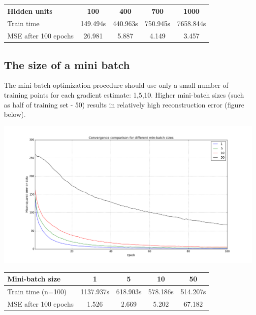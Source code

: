 \documentclass[a4paper]{scrartcl}
\begin{document}
\hspace{1cm}
\begin{tabular}{ | l || c | c | c | c | } 
	\hline
	Hidden units & 100 & 400 & 700 & 1000 \\ \hline
	Train time & 149.494s & 440.963s & 750.945s & 7658.844s \\ \hline
	MSE after 100 epochs & 26.981 & 5.887 & 4.149 & 3.457\\ 
	\hline 
\end{tabular}
\subsection{The size of a mini batch}
The mini-batch optimization procedure should use only a small number of training points for each gradient estimate: 1,5,10. Higher mini-batch sizes (such as half of training set - 50) results in relatively high reconstruction error (figure below). 
\begin{center}
\includegraphics[width=14cm]{images/batch.png}
\end{center}
\hspace{1cm}
\begin{tabular}{|l||c|c|c|c|} \hline
Mini-batch size & 1 & 5 & 10 & 50
\\ \hline
Train time (n=100) & 1137.937s & 618.903s & 578.186s & 514.207s
\\ \hline
MSE after 100 epochs & 1.526 & 2.669 & 5.202 & 67.182
\\ \hline \end{tabular}
\end{document}

